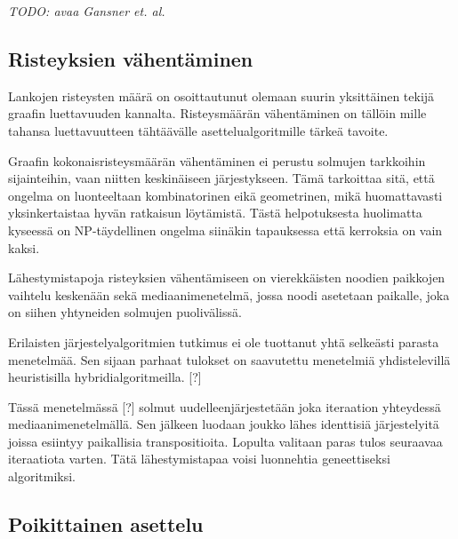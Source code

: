 \documentclass[finnish,12pt]{article}
\begin{document}
\emph{TODO: avaa Gansner et. al.}

		\subsection{Risteyksien vähentäminen}

Lankojen risteysten määrä on osoittautunut olemaan suurin yksittäinen tekijä graafin luettavuuden kannalta. \cite{RefWorks:47}
Risteysmäärän vähentäminen on tällöin mille tahansa luettavuutteen tähtäävälle asettelualgoritmille tärkeä tavoite.

Graafin kokonaisristeysmäärän vähentäminen ei perustu solmujen tarkkoihin sijainteihin, vaan niitten keskinäiseen järjestykseen. Tämä tarkoittaa sitä, että ongelma on luonteeltaan kombinatorinen eikä geometrinen, mikä huomattavasti yksinkertaistaa hyvän ratkaisun löytämistä.
Tästä helpotuksesta huolimatta kyseessä on NP-täydellinen ongelma siinäkin tapauksessa että kerroksia on vain kaksi. \cite{RefWorks:40}

Lähestymistapoja risteyksien vähentämiseen on vierekkäisten noodien paikkojen
vaihtelu keskenään sekä mediaanimenetelmä, jossa noodi asetetaan paikalle, joka
on siihen yhtyneiden solmujen puolivälissä.


Erilaisten järjestelyalgoritmien tutkimus ei ole tuottanut yhtä selkeästi parasta menetelmää.
Sen sijaan parhaat tulokset on saavutettu menetelmiä yhdistelevillä heuristisilla hybridialgoritmeilla. [?]

Tässä menetelmässä [?] solmut uudelleenjärjestetään joka iteraation yhteydessä mediaanimenetelmällä.
Sen jälkeen luodaan joukko lähes identtisiä järjestelyitä joissa esiintyy paikallisia transpositioita.
Lopulta valitaan paras tulos seuraavaa iteraatiota varten.
Tätä lähestymistapaa voisi luonnehtia geneettiseksi algoritmiksi.


		\subsection{Poikittainen asettelu}
\end{document}
